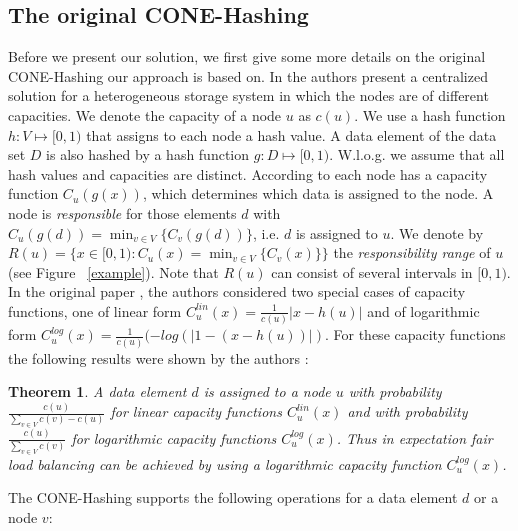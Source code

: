 \documentclass[11pt]{article}
\newtheorem{theorem}{Theorem}[section]
\begin{document}
\subsection{The original CONE-Hashing}

Before we present our solution, we
first give some more details on the original CONE-Hashing \cite{cone} our
approach is based on. In \cite{cone} the authors present a centralized
solution for a heterogeneous storage system in which the nodes are of
different capacities. We denote the  capacity of a node $u$ as $c(u)$. We use
a hash function $h:V\mapsto [0,1)$ that assigns to each node a hash value. A
data element of the data set $D$ is also hashed by a hash function $g: D
\mapsto [0,1)$. W.l.o.g. we assume that all hash values and capacities are
distinct.  According to \cite{cone} each node has a capacity function
$C_u(g(x))$, which determines which data is assigned to the node. A node is
\emph{responsible} for those elements $d$ with $C_u(g(d))=\min_{v
\in V}\{C_v(g(d))\}$, i.e. $d$ is assigned to $u$. We denote by $R(u)=\{x \in
[0,1): C_u(x)=\min_{v \in V}\{C_v(x)\} \}$ the \emph{responsibility range} of
$u$  (see Figure ~\ref{example}). Note that $R(u)$ can consist of several intervals in $[0,1)$.
In the original paper \cite{cone}, the authors considered two special cases
of capacity functions, one of linear form
$C^{lin}_u(x)=\frac{1}{c(u)}|x-h(u)|$ and of logarithmic form
$C^{log}_u(x)=\frac{1}{c(u)}(-log(|1-(x-h(u))|)$. For these capacity
functions the following results were shown by the authors \cite{cone}:

\begin{theorem}\label{theo:coneOriginal1}
A data element $d$ is assigned to a node $u$ with probability
$\frac{c(u)}{\sum_{v \in V}{c(v)}-c(u)}$ for linear capacity functions
$C^{lin}_u(x)$ and with probability $\frac{c(u)}{\sum_{v\in V}{c(v)}}$ for logarithmic capacity functions $C^{log}_u(x)$. Thus in expectation fair load balancing can be achieved by using a logarithmic
capacity function $C^{log}_u(x)$.
\end{theorem}

The CONE-Hashing supports the following operations for a data element $d$ or
a node $v$:
\end{document}

